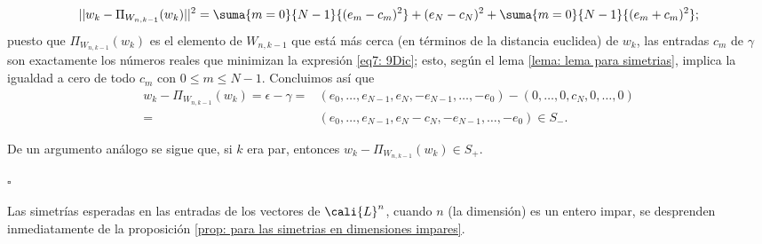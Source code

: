 \begin{itemize}
\begin{equation}
\label{eq7: 9Dic}
|| w_{k}-\Pi_{W_{n,k-1}}(w_{k}) ||^{2}= 
\suma{m=0}{N-1}{(e_{m}-c_{m})^{2}} + (e_{N}-c_{N})^{2}
+ \suma{m=0}{N-1}{(e_{m}+c_{m})^{2}};
\end{equation}
puesto que $\Pi_{W_{n,k-1}}(w_{k})$ es el elemento
de $W_{n,k-1}$ que está más cerca
(en términos de la distancia euclidea) de $w_{k}$,
las entradas
$c_{m}$ de $\gamma$ son exactamente
los números reales que minimizan la expresión
\eqref{eq7: 9Dic}; esto, según el lema
\eqref{lema: lema para simetrias}, implica la igualdad 
a cero de todo $c_{m}$ con $0 \leq m \leq N-1$.
Concluimos así que 
\begin{align*}
w_{k}-\Pi_{W_{n,k-1}}(w_{k}) =  \epsilon - \gamma
=  & (e_{0}, \ldots , e_{N-1}, e_{N}, -e_{N-1}, \ldots , -e_{0})-
(0, \ldots , 0, c_{N}, 0, \ldots ,0 ) \\
= & (e_{0}, \ldots , e_{N-1}, e_{N}-c_{N}, -e_{N-1}, \ldots , -e_{0}) \in S_{-}.
\end{align*}

De un argumento análogo se sigue que, 
si $k$ era par, entonces
$w_{k}-\Pi_{W_{n,k-1}}(w_{k}) \in S_{+}$.
\end{itemize}
\null\nobreak\hfill\ensuremath{\square} %
\vspace{0.2cm}

Las simetrías esperadas en las entradas de los vectores
de $\cali{L}^{n}$, cuando $n$ (la dimensión)
es un entero impar, se desprenden inmediatamente de
la proposición 
\ref{prop: para las simetrias en dimensiones impares}.

